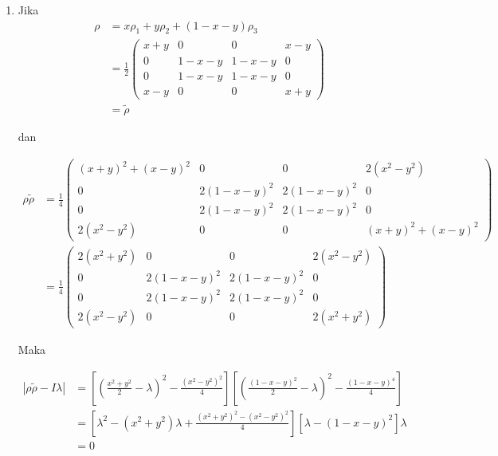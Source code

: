 \begin{enumerate}
	sehingga $\lambda_1=x$, $\lambda_2=(1-x)$, dan $\lambda_3=\lambda_4=0$.
	
	\item Jika
	\begin{equation}
		\begin{aligned}
			\rho
			&=x\rho_1+y\rho_2+(1-x-y)\rho_3\\
			&=\frac{1}{2}
			\begin{pmatrix}
				x+y&0&0&x-y\\
				0&1-x-y&1-x-y&0\\
				0&1-x-y&1-x-y&0\\
				x-y&0&0&x+y
			\end{pmatrix}\\
			&=\tilde{\rho}
		\end{aligned}
	\end{equation}
	
	dan
	
	\begin{equation}
		\begin{aligned}
			\rho \tilde{\rho}
			&=\frac{1}{4}
			\begin{pmatrix}
				(x+y)^2+(x-y)^2&0&0&2(x^2-y^2)\\
				0&2(1-x-y)^2&2(1-x-y)^2&0\\
				0&2(1-x-y)^2&2(1-x-y)^2&0\\
				2(x^2-y^2)&0&0&(x+y)^2+(x-y)^2
			\end{pmatrix}\\
			&=\frac{1}{4}
			\begin{pmatrix}
				2(x^2+y^2)&0&0&2(x^2-y^2)\\
				0&2(1-x-y)^2&2(1-x-y)^2&0\\
				0&2(1-x-y)^2&2(1-x-y)^2&0\\
				2(x^2-y^2)&0&0&2(x^2+y^2)
			\end{pmatrix}
		\end{aligned}
	\end{equation}
	
	Maka
	
	\begin{equation}
		\begin{aligned}
			|\rho \tilde{\rho}-I\lambda|
			&=[(\frac{x^2+y^2}{2}-\lambda)^2-\frac{(x^2-y^2)^2}{4}][(\frac{(1-x-y)^2}{2}-\lambda)^2-\frac{(1-x-y)^4}{4}]\\
			&=[\lambda^2-(x^2+y^2)\lambda+\frac{(x^2+y^2)^2-(x^2-y^2)^2}{4}][\lambda-(1-x-y)^2]\lambda\\
			&=0
		\end{aligned}
	\end{equation}
	

\end{enumerate}
